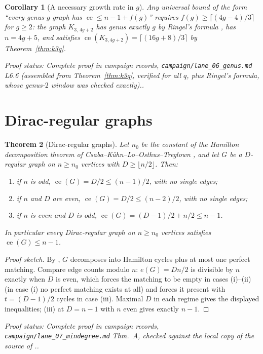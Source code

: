 \documentclass[a4paper,11pt]{amsart}
\newtheorem{theorem}{Theorem}[section]
\newtheorem{corollary}[theorem]{Corollary}
\theoremstyle{definition}
\theoremstyle{remark}
\newcommand{\ce}{\operatorname{ce}}
\newcommand{\proofsrc}[1]{\par\smallskip\noindent\begin{sloppypar}\small\emph{Proof status: #1.}\end{sloppypar}\par\smallskip}
\begin{document}
\begin{corollary}[A necessary growth rate in $g$]\label{cor:genuslb}
Any universal bound of the form ``every genus-$g$ graph has $\ce\le n-1+f(g)$'' requires
$f(g)\ge\lceil(4g-4)/3\rceil$ for $g\ge2$: the graph $K_{3,\,4g+2}$ has genus exactly $g$ by Ringel's
formula \cite{Ri74}, has $n=4g+5$, and satisfies $\ce(K_{3,4g+2})=\lceil(16g+8)/3\rceil$ by
Theorem~\ref{thm:k3q}.
\end{corollary}
\proofsrc{Complete proof in campaign records, \texttt{campaign/lane\_06\_genus.md} L6.6 (assembled from
Theorem~\ref{thm:k3q}, verified for all $q$, plus Ringel's formula, whose genus-$2$ window was checked
exactly).}

\section{Dirac-regular graphs}\label{sec:dirac}

\begin{theorem}[Dirac-regular graphs]\label{thm:dirac}
Let $n_0$ be the constant of the Hamilton decomposition theorem of Csaba--K\"uhn--Lo--Osthus--Treglown
\cite{CKLOT16}, and let $G$ be a $D$-regular graph on $n\ge n_0$ vertices with $D\ge\lfloor n/2\rfloor$.
Then:
\begin{enumerate}
\item[(i)] if $n$ is odd, $\ce(G)=D/2\le (n-1)/2$, with no single edges;
\item[(ii)] if $n$ and $D$ are even, $\ce(G)=D/2\le (n-2)/2$, with no single edges;
\item[(iii)] if $n$ is even and $D$ is odd, $\ce(G)=(D-1)/2+n/2\le n-1$.
\end{enumerate}
In particular every Dirac-regular graph on $n\ge n_0$ vertices satisfies $\ce(G)\le n-1$.
\end{theorem}
\begin{proof}[Proof sketch]
By \cite{CKLOT16}, $G$ decomposes into Hamilton cycles plus at most one perfect matching. Compare edge
counts modulo $n$: $e(G)=Dn/2$ is divisible by $n$ exactly when $D$ is even, which forces the matching to
be empty in cases (i)--(ii) (in case (i) no perfect matching exists at all) and forces it present with
$t=(D-1)/2$ cycles in case (iii). Maximal $D$ in each regime gives the displayed inequalities; (iii) at
$D=n-1$ with $n$ even gives exactly $n-1$.
\end{proof}
\proofsrc{Complete proof in campaign records, \texttt{campaign/lane\_07\_mindegree.md} Thm.~A, checked
against the local copy of the source of \cite{CKLOT16}.}
\end{document}

